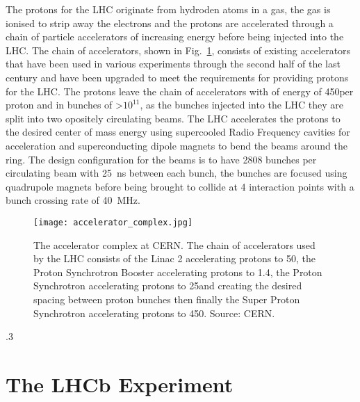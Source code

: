 The protons for the LHC originate from hydroden atoms in a gas, the gas is ionised to strip away the electrons and the protons are accelerated through a chain of particle accelerators of increasing energy before being injected into the LHC. The chain of accelerators, shown in Fig.~\ref{fig:accelerator_chain}, consists of existing accelerators that have been used in various experiments through the second half of the last century and have been upgraded to meet the requirements for providing protons for the LHC. 
The protons leave the chain of accelerators with of energy of 450\gev per proton and in bunches of  >$10^{11}$, as the bunches injected into the LHC they are split into two opositely circulating beams.
The LHC accelerates the protons to the desired center of mass energy using supercooled Radio Frequency cavities for acceleration and superconducting dipole magnets to bend the beams around the ring. 
The design configuration for the beams is to have 2808 bunches per circulating beam with 25~ns between each bunch, the bunches are focused using quadrupole magnets before being brought to collide at 4 interaction points with a bunch crossing rate of 40~MHz. 

\begin{figure}[htbp!] 
\centering    
\texttt{[image: accelerator\_complex.jpg]}
\caption{The accelerator complex at CERN. The chain of accelerators used by the LHC consists of the Linac 2 accelerating protons to 50\mev, the Proton Synchrotron Booster accelerating protons to 1.4\gev, the Proton Synchrotron accelerating protons to 25\gev and creating the desired spacing between proton bunches then finally the Super Proton Synchrotron accelerating protons to 450\gev. Source: CERN.}
\label{fig:accelerator_chain}
\end{figure}

.3
\section{The LHCb Experiment}
\label{LHCb}
